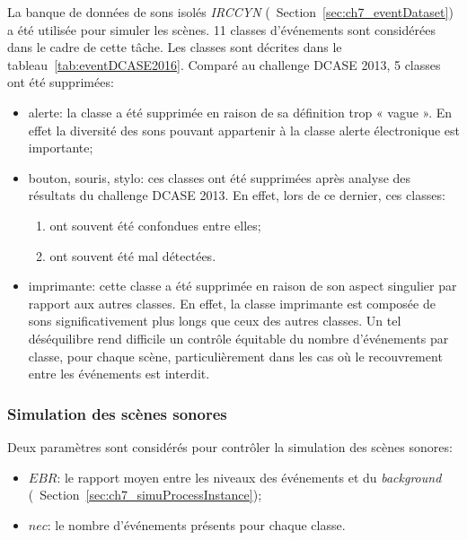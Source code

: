 La banque de données de sons isolés \emph{IRCCYN} (\cf~Section~\ref{sec:ch7_eventDataset}) a été utilisée pour simuler les scènes. 11 classes d'événements sont considérées dans le cadre de cette tâche. Les classes sont décrites dans le tableau~\ref{tab:eventDCASE2016}. Comparé au challenge DCASE 2013, 5 classes ont été supprimées:

\begin{itemize}
\item alerte: la classe a été supprimée en raison de sa définition trop « vague ». En effet la diversité des sons pouvant appartenir à la classe alerte électronique est importante;

\item bouton, souris, stylo: ces classes ont été supprimées après analyse des résultats du challenge DCASE 2013. En effet, lors de ce dernier, ces classes:

\begin{enumerate}
\item ont souvent été confondues entre elles;
\item ont souvent été mal détectées. 
\end{enumerate}

\item imprimante: cette classe a été supprimée en raison de son aspect singulier par rapport aux autres classes. En effet, la classe imprimante est composée de sons significativement plus longs que ceux des autres classes. Un tel déséquilibre rend difficile un contrôle équitable du nombre d'événements par classe, pour chaque scène, particulièrement dans les cas où le recouvrement entre les événements est interdit.

\end{itemize}

\subsubsection{Simulation des scènes sonores}
\label{sec:ch7_simulationDcase2016}

Deux paramètres sont considérés pour contrôler la simulation des scènes sonores:

\begin{itemize}
\item $EBR$: le rapport moyen entre les niveaux des événements et du \emph{background} (\cf~Section~\ref{sec:ch7_simuProcessInstance});
\item $nec$: le nombre d'événements présents pour chaque classe.
\end{itemize}

